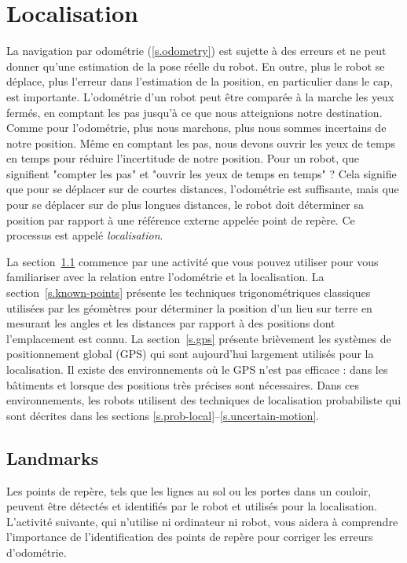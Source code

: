 
\chapter{Localisation}\label{ch.local}

La navigation par odométrie (\ref{s.odometry}) est sujette à des erreurs et ne peut donner qu'une estimation de la pose réelle du robot. En outre, plus le robot se déplace, plus l'erreur dans l'estimation de la position, en particulier dans le cap, est importante. L'odométrie d'un robot peut être comparée à la marche les yeux fermés, en comptant les pas jusqu'à ce que nous atteignions notre destination. Comme pour l'odométrie, plus nous marchons, plus nous sommes incertains de notre position. Même en comptant les pas, nous devons ouvrir les yeux de temps en temps pour réduire l'incertitude de notre position. Pour un robot, que signifient "compter les pas" et "ouvrir les yeux de temps en temps" ? Cela signifie que pour se déplacer sur de courtes distances, l'odométrie est suffisante, mais que pour se déplacer sur de plus longues distances, le robot doit déterminer sa position par rapport à une référence externe appelée point de repère. Ce processus est appelé \emph{localisation}.

La section~\ref{s.landmarks} commence par une activité que vous pouvez utiliser pour vous familiariser avec la relation entre l'odométrie et la localisation. La section~\ref{s.known-points} présente les techniques trigonométriques classiques utilisées par les géomètres pour déterminer la position d'un lieu sur terre en mesurant les angles et les distances par rapport à des positions dont l'emplacement est connu. La section~\ref{s.gps} présente brièvement les systèmes de positionnement global (GPS) qui sont aujourd'hui largement utilisés pour la localisation. Il existe des environnements où le GPS n'est pas efficace : dans les bâtiments et lorsque des positions très précises sont nécessaires. Dans ces environnements, les robots utilisent des techniques de localisation probabiliste qui sont décrites dans les sections \ref{s.prob-local}--\ref{s.uncertain-motion}.

\section{Landmarks}\label{s.landmarks}

Les points de repère, tels que les lignes au sol ou les portes dans un couloir, peuvent être détectés et identifiés par le robot et utilisés pour la localisation. L'activité suivante, qui n'utilise ni ordinateur ni robot, vous aidera à comprendre l'importance de l'identification des points de repère pour corriger les erreurs d'odométrie.

